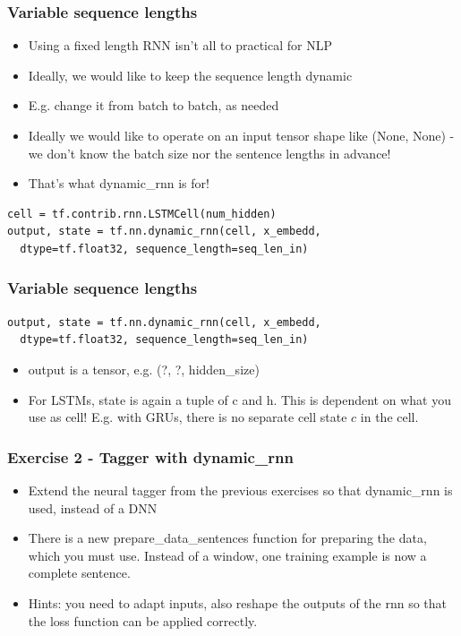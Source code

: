 \documentclass{beamer}
\begin{document}
\begin{frame}[fragile]
\frametitle{Variable sequence lengths}
  \begin{itemize}
  	\item Using a fixed length RNN isn't all to practical for NLP
  	\item Ideally, we would like to keep the sequence length dynamic
  	\item E.g. change it from batch to batch, as needed
  	\item Ideally we would like to operate on an input tensor shape like (None, None) - we don't know the batch size nor the sentence lengths in advance!
  	\item That's what dynamic\_rnn is for!	
  \end{itemize}
  
  \begin{footnotesize}
\begin{lstlisting}
cell = tf.contrib.rnn.LSTMCell(num_hidden)
output, state = tf.nn.dynamic_rnn(cell, x_embedd,
  dtype=tf.float32, sequence_length=seq_len_in)
\end{lstlisting}   
\end{footnotesize}   

\end{frame}

\begin{frame}[fragile]
 \frametitle{Variable sequence lengths}
\begin{footnotesize}
\begin{lstlisting}
output, state = tf.nn.dynamic_rnn(cell, x_embedd,
  dtype=tf.float32, sequence_length=seq_len_in)
\end{lstlisting}   
\end{footnotesize}   

 \begin{itemize}
  	\item output is a tensor, e.g. (?, ?, hidden\_size)
  	
  	\item For LSTMs, state is again a tuple of c and h. This is dependent on what you use as cell! E.g. with GRUs, there is no separate cell state $c$ in the cell.
 \end{itemize}
			
\end{frame}		

\begin{frame}[fragile]
\frametitle{Exercise 2 - Tagger with dynamic\_rnn}
  \begin{itemize}
  	\item Extend the neural tagger from the previous exercises so that dynamic\_rnn is used, instead of a DNN
  	\item There is a new prepare\_data\_sentences function for preparing the data, which you must use. Instead of a window, one training example is now a complete sentence.
  	\item Hints: you need to adapt inputs, also reshape the outputs of the rnn so that the loss function can be applied correctly.
	
  \end{itemize}
\end{frame}
\end{document}
